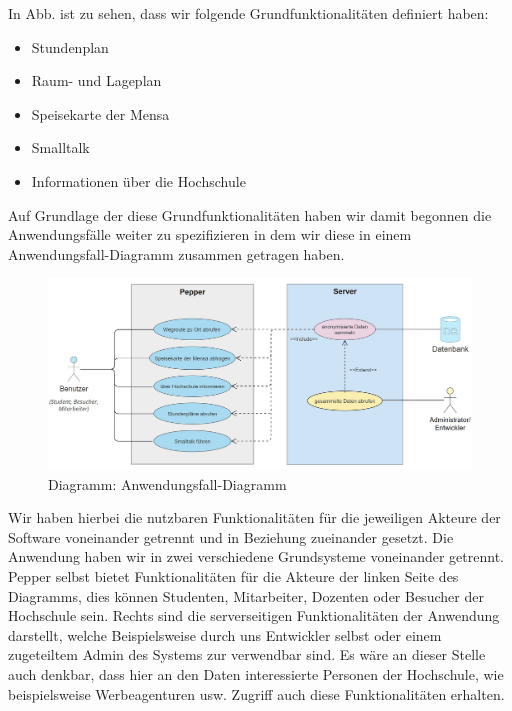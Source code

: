 

In Abb. %
ist zu sehen, dass wir folgende Grundfunktionalitäten definiert haben:

\begin{itemize}
    \item Stundenplan
    \item Raum- und Lageplan
    \item Speisekarte der Mensa
    \item Smalltalk
    \item Informationen über die Hochschule
\end{itemize}

Auf Grundlage der diese Grundfunktionalitäten haben wir damit begonnen die Anwendungsfälle weiter zu spezifizieren in dem wir diese in einem Anwendungsfall-Diagramm zusammen getragen haben. 

\begin{figure}[H]
    \includegraphics[width=\textwidth]{Figures/use-case-diagram.jpg}
    \caption{Diagramm: Anwendungsfall-Diagramm}
    \label{fig:integration}
    \centering
\end{figure}

Wir haben hierbei die nutzbaren Funktionalitäten für die jeweiligen Akteure der Software voneinander getrennt und in Beziehung zueinander gesetzt. Die Anwendung haben wir in zwei verschiedene Grundsysteme voneinander getrennt. Pepper selbst bietet Funktionalitäten für die Akteure der linken Seite des Diagramms, dies können Studenten, Mitarbeiter, Dozenten oder Besucher der Hochschule sein. Rechts sind die serverseitigen Funktionalitäten der Anwendung darstellt, welche Beispielsweise durch uns Entwickler selbst oder einem zugeteiltem Admin des Systems zur verwendbar sind. Es wäre an dieser Stelle auch denkbar, dass hier an den Daten interessierte Personen der Hochschule, wie beispielsweise Werbeagenturen usw. Zugriff auch diese Funktionalitäten erhalten.

